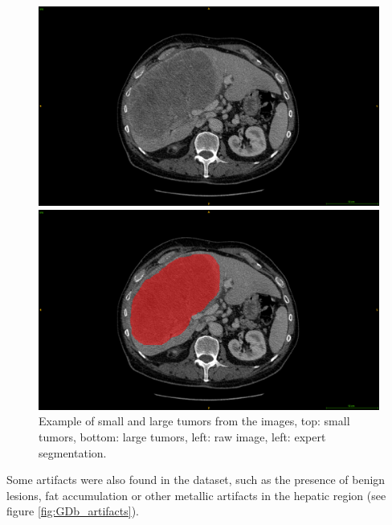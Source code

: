 {\begin{figure}[!ht]
\begin{mdframed}[backgroundcolor=blue!50,linecolor=blue!50]
\begin{minipage}{0.45\linewidth}
		\end{minipage} \\
		\begin{minipage}{0.45\linewidth}
			\includegraphics[width=\linewidth]{images/GDB_examplePatientLargeTumor}
		\end{minipage} \hspace{-0.1cm}
		\begin{minipage}{0.45\linewidth}
			\includegraphics[width=\linewidth]{images/GDB_examplePatientLargeTumor_seg}
		\end{minipage}
	\end{mdframed}
	\caption{Example of small and large tumors from the \textbf{} images, top: small tumors, bottom: large tumors, left: raw image, left: expert segmentation.}
	\label{fig:interdb_tumorSeg_tumorExamples}
\end{figure}
Some artifacts were also found in the \textbf{} dataset, such as the presence of benign lesions, fat accumulation or other metallic artifacts in the hepatic region (see figure \ref{fig:GDb_artifacts}).
}
